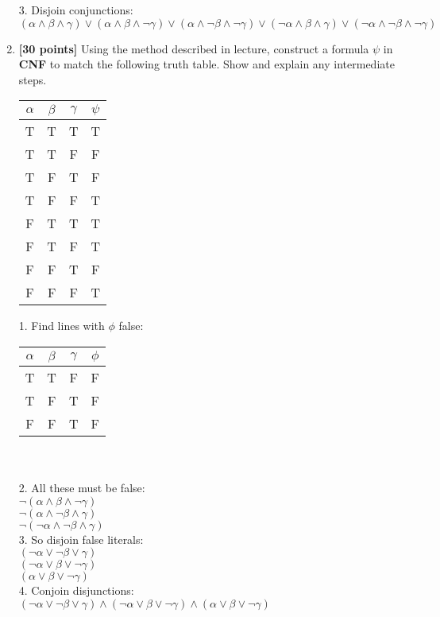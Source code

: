 \documentclass{article}
\begin{document}
\begin{enumerate}
\begin{answer}
    3. Disjoin conjunctions:\\
    $(\alpha \land \beta \land \gamma) \vee
    (\alpha \land \beta \land \neg \gamma) \vee
    (\alpha \land \neg \beta \land \neg \gamma) \vee
    (\neg \alpha \land \beta \land \gamma) \vee 
    (\neg \alpha \land \neg \beta \land \neg \gamma)$
  \end{answer}

\item \textbf{[30 points]} Using the method described in lecture,
  construct a formula $\psi$ in \textbf{CNF} to match the following
  truth table.  Show and explain any intermediate steps.
  \begin{center}
    \begin{tabular}{ccc|c}
      $\alpha$ & $\beta$ & $\gamma$ & $\psi$ \\ \hline
      T & T & T & T\\
      T & T & F & F\\
      T & F & T & F\\
      T & F & F & T\\
      F & T & T & T\\
      F & T & F & T\\
      F & F & T & F\\
      F & F & F & T
    \end{tabular}
  \end{center}
  \begin{answer}
    1. Find lines with $\phi$ false:\\
    \begin{tabular}{ccc|c}
      $\alpha$ & $\beta$ & $\gamma$ & $\phi$ \\ \hline
      T & T & F & F\\
      T & F & T & F\\
      F & F & T & F\\
    \end{tabular}\\ \\
    2. All these must be false:\\
    $\neg (\alpha \land \beta \land \neg \gamma)$\\
    $\neg (\alpha \land \neg \beta \land \gamma)$\\
    $\neg (\neg \alpha \land \neg \beta \land \gamma)$\\
    3. So disjoin false literals:\\
    $(\neg \alpha \vee \neg \beta \vee \gamma)$\\
    $(\neg \alpha \vee \beta \vee \neg \gamma)$\\
    $(\alpha \vee \beta \vee \neg \gamma)$\\
    4. Conjoin disjunctions:\\
    $(\neg \alpha \vee \neg \beta \vee \gamma) \land
    (\neg \alpha \vee \beta \vee \neg \gamma) \land
    (\alpha \vee \beta \vee \neg \gamma)$\\
    

\end{answer}
\end{enumerate}
\end{document}
